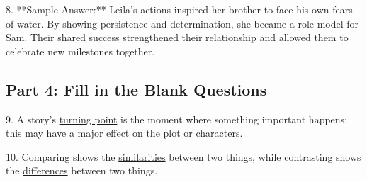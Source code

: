 \documentclass[12pt]{article}
\begin{document}
8. **Sample Answer:** Leila’s actions inspired her brother to face his own fears of water. By showing persistence and determination, she became a role model for Sam. Their shared success strengthened their relationship and allowed them to celebrate new milestones together.  

\subsection*{Part 4: Fill in the Blank Questions}

9. A story’s \underline{turning point} is the moment where something important happens; this may have a major effect on the plot or characters.

10. Comparing shows the \underline{similarities} between two things, while contrasting shows the \underline{differences} between two things.
\end{document}
